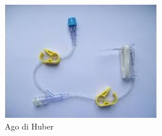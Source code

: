 \begin{figure}[H]
    \begin{center}
    \includegraphics[width=0.5\columnwidth]{img/agohuber.jpeg}
    \end{center}
    \caption{Ago di Huber
    \cite{img45}}

\end{figure}


